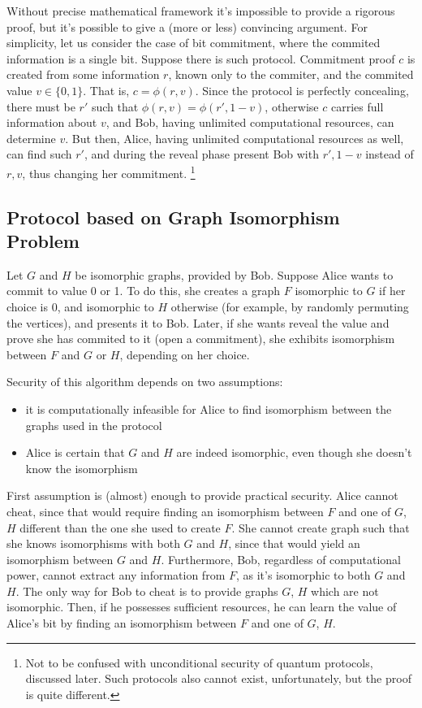 \documentclass[10pt]{article}
\begin{document}
Without precise mathematical framework it's impossible to provide a rigorous proof, but it's possible 
to give a (more or less) convincing argument. For simplicity, let us consider the case of bit 
commitment, where the commited information is a single bit. Suppose there is such protocol. Commitment 
proof \(c\) is created from some information \(r\), known only to the commiter, and the commited value 
\(v\in\{0,1\}\). That is, \(c=\phi(r,v)\). Since the protocol is perfectly concealing, there must
be \(r'\) such that \(\phi(r,v)=\phi(r',1-v)\), otherwise \(c\) carries full information about \(v\),
and Bob, having unlimited computational resources, can determine \(v\). But then, Alice, having 
unlimited computational resources as well, can find such \(r'\), and during the reveal phase present 
Bob with \(r', 1-v\) instead of \(r, v\), thus changing her commitment.
\footnote{Not to be confused with unconditional security of quantum protocols, discussed later.
Such protocols also cannot exist, unfortunately, but the proof is quite different.}

\subsection{Protocol based on Graph Isomorphism Problem}

Let \(G\) and \(H\) be isomorphic graphs, provided by Bob. Suppose Alice wants to commit to value 0
or 1. To do this, she creates a graph \(F\) isomorphic to \(G\) if her choice is 0, and isomorphic 
to \(H\) otherwise (for example, by randomly permuting the vertices), and presents it to Bob. Later,
if she wants reveal the value and prove she has commited to it (open a commitment), she exhibits 
isomorphism between \(F\) and \(G\) or \(H\), depending on her choice.

Security of this algorithm depends on two assumptions:

\begin{itemize}
  \item it is computationally infeasible for Alice to find isomorphism between the graphs used in the
    protocol
  \item Alice is certain that \(G\) and \(H\) are indeed isomorphic, even though she doesn't know
    the isomorphism
\end{itemize}

First assumption is (almost) enough to provide practical security. Alice cannot cheat, since that would
require finding an isomorphism between \(F\) and one of \(G\), \(H\) different than the one she used to
create \(F\). She cannot create graph such that she knows isomorphisms with both \(G\) and \(H\), since
that would yield an isomorphism between \(G\) and \(H\). Furthermore, Bob, regardless of computational
power, cannot extract any information from \(F\), as it's isomorphic to both \(G\) and \(H\). The only 
way for Bob to cheat is to provide graphs \(G\), \(H\) which are not isomorphic. Then, if he possesses
sufficient resources, he can learn the value of Alice's bit by finding an isomorphism between \(F\) and
one of \(G\), \(H\).
\end{document}
